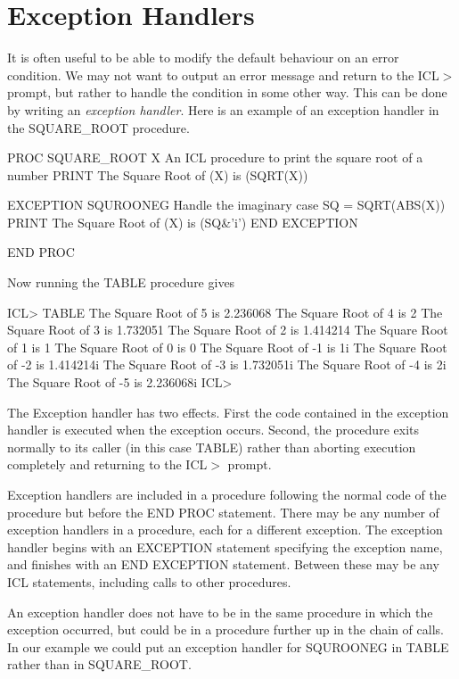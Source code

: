 \documentclass[twoside,11pt,nolof,chapters]{starlink}
\begin{document}
\section{Exception Handlers}

It is often useful to be able to modify the default behaviour on an
error condition. We may not want to output an error message and return
to the ICL$>$ prompt, but rather to handle the condition in some other way.
This can be done by writing an \emph{exception handler}. Here is an
example of an exception handler in the SQUARE\_ROOT procedure.

\begin{terminalv}
    PROC SQUARE_ROOT X
    {  An ICL procedure to print the square root of a number   }
      PRINT The Square Root of (X) is (SQRT(X))

      EXCEPTION SQUROONEG
        {  Handle the imaginary case  }
        SQ = SQRT(ABS(X))
        PRINT The Square Root of (X) is (SQ&'i')
      END EXCEPTION

    END PROC
\end{terminalv}

Now running the TABLE procedure gives

\begin{terminalv}
    ICL> TABLE
    The Square Root of 5 is 2.236068
    The Square Root of 4 is 2
    The Square Root of 3 is 1.732051
    The Square Root of 2 is 1.414214
    The Square Root of 1 is 1
    The Square Root of 0 is 0
    The Square Root of -1 is 1i
    The Square Root of -2 is 1.414214i
    The Square Root of -3 is 1.732051i
    The Square Root of -4 is 2i
    The Square Root of -5 is 2.236068i
    ICL>
\end{terminalv}
The Exception handler has two effects. First the code contained in the
exception handler is executed when the exception occurs. Second, the procedure
exits normally to its caller (in this case TABLE) rather than aborting
execution completely and returning to the ICL$>$ prompt.

Exception handlers are included in a procedure following the normal code
of the procedure but before the END PROC statement. There may be any number
of exception handlers in a procedure, each for a different exception.
The exception handler begins with an EXCEPTION statement specifying the
exception name, and finishes with an END EXCEPTION statement. Between
these may be any ICL statements, including calls to other procedures.

An exception handler does not have to be in the same procedure in which the
exception occurred, but could be in a procedure further up in the chain of
calls. In our example we could put an exception handler for SQUROONEG in
TABLE rather than in SQUARE\_ROOT.
\end{document}
